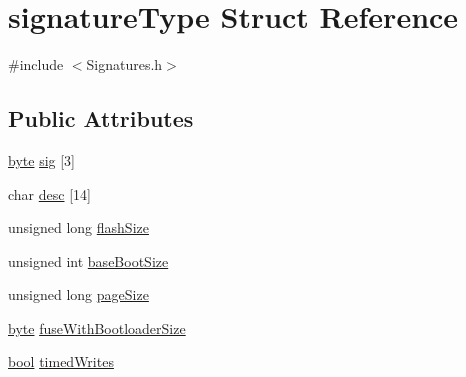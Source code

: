 \hypertarget{structsignatureType}{\section{signature\-Type Struct Reference}
\label{structsignatureType}
}


{\ttfamily \#include $<$Signatures.\-h$>$}

\subsection*{Public Attributes}
\begin{DoxyCompactItemize}
\item 
\hyperlink{Arduino_8h_ab8ef12fab634c171394422d0ee8baf94}{byte} \hyperlink{structsignatureType_a3d5f31e69660e3fd3b84934160100916}{sig} \mbox{[}3\mbox{]}
\item 
char \hyperlink{structsignatureType_a0b7843580369ea2d3d1711d0d4b096b4}{desc} \mbox{[}14\mbox{]}
\item 
unsigned long \hyperlink{structsignatureType_ab5e5df507baa15cfa0fb6c2daf612aba}{flash\-Size}
\item 
unsigned int \hyperlink{structsignatureType_a7dd0a8e83dfcc0d99c3df91df677deb7}{base\-Boot\-Size}
\item 
unsigned long \hyperlink{structsignatureType_aab8d1a02bbb77dad6a2c177b484d796f}{page\-Size}
\item 
\hyperlink{Arduino_8h_ab8ef12fab634c171394422d0ee8baf94}{byte} \hyperlink{structsignatureType_af59f32da539eebc640b0a402f41264c0}{fuse\-With\-Bootloader\-Size}
\item 
\hyperlink{stdbool_8h_abb452686968e48b67397da5f97445f5b}{bool} \hyperlink{structsignatureType_af2757a76a18782b155f68ad533c89a17}{timed\-Writes}
\end{DoxyCompactItemize}


